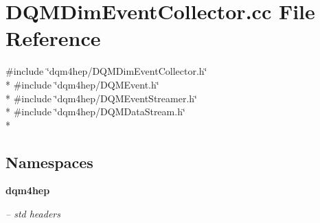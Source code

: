 \section{D\+Q\+M\+Dim\+Event\+Collector.\+cc File Reference}
\label{DQMDimEventCollector_8cc}
{\ttfamily \#include \char`\"{}dqm4hep/\+D\+Q\+M\+Dim\+Event\+Collector.\+h\char`\"{}}\\*
{\ttfamily \#include \char`\"{}dqm4hep/\+D\+Q\+M\+Event.\+h\char`\"{}}\\*
{\ttfamily \#include \char`\"{}dqm4hep/\+D\+Q\+M\+Event\+Streamer.\+h\char`\"{}}\\*
{\ttfamily \#include \char`\"{}dqm4hep/\+D\+Q\+M\+Data\+Stream.\+h\char`\"{}}\\*
\subsection*{Namespaces}
\begin{DoxyCompactItemize}
\item 
 {\bf dqm4hep}
\begin{DoxyCompactList}\small\item\em -- std headers \end{DoxyCompactList}\end{DoxyCompactItemize}
